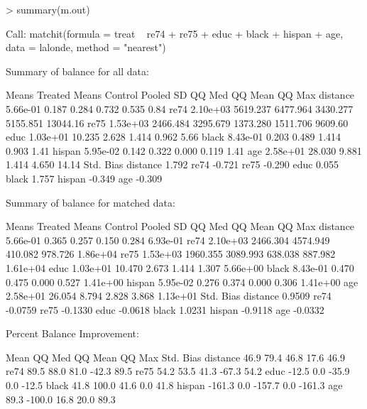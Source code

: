 \documentclass[oneside,letterpaper,titlepage]{article}
\begin{document}
\begin{enumerate}
\begin{Schunk}
\begin{Sinput}
> summary(m.out)
\end{Sinput}
\begin{Soutput}

Call:
matchit(formula = treat ~ re74 + re75 + educ + black + hispan +     age, data = lalonde, method = "nearest")

Summary of balance for all data:

         Means Treated Means Control Pooled SD   QQ Med  QQ Mean   QQ Max
distance      5.66e-01         0.187     0.284    0.732    0.535     0.84
re74          2.10e+03      5619.237  6477.964 3430.277 5155.851 13044.16
re75          1.53e+03      2466.484  3295.679 1373.280 1511.706  9609.60
educ          1.03e+01        10.235     2.628    1.414    0.962     5.66
black         8.43e-01         0.203     0.489    1.414    0.903     1.41
hispan        5.95e-02         0.142     0.322    0.000    0.119     1.41
age           2.58e+01        28.030     9.881    1.414    4.650    14.14
         Std. Bias
distance     1.792
re74        -0.721
re75        -0.290
educ         0.055
black        1.757
hispan      -0.349
age         -0.309

Summary of balance for matched data:

         Means Treated Means Control Pooled SD  QQ Med QQ Mean   QQ Max
distance      5.66e-01         0.365     0.257   0.150   0.284 6.93e-01
re74          2.10e+03      2466.304  4574.949 410.082 978.726 1.86e+04
re75          1.53e+03      1960.355  3089.993 638.038 887.982 1.61e+04
educ          1.03e+01        10.470     2.673   1.414   1.307 5.66e+00
black         8.43e-01         0.470     0.475   0.000   0.527 1.41e+00
hispan        5.95e-02         0.276     0.374   0.000   0.306 1.41e+00
age           2.58e+01        26.054     8.794   2.828   3.868 1.13e+01
         Std. Bias
distance    0.9509
re74       -0.0759
re75       -0.1330
educ       -0.0618
black       1.0231
hispan     -0.9118
age        -0.0332

Percent Balance Improvement:

           Mean QQ Med QQ Mean QQ Max Std. Bias
distance   46.9   79.4    46.8   17.6      46.9
re74       89.5   88.0    81.0  -42.3      89.5
re75       54.2   53.5    41.3  -67.3      54.2
educ      -12.5    0.0   -35.9    0.0     -12.5
black      41.8  100.0    41.6    0.0      41.8
hispan   -161.3    0.0  -157.7    0.0    -161.3
age        89.3 -100.0    16.8   20.0      89.3


\end{Soutput}
\end{Schunk}
\end{enumerate}
\end{document}
